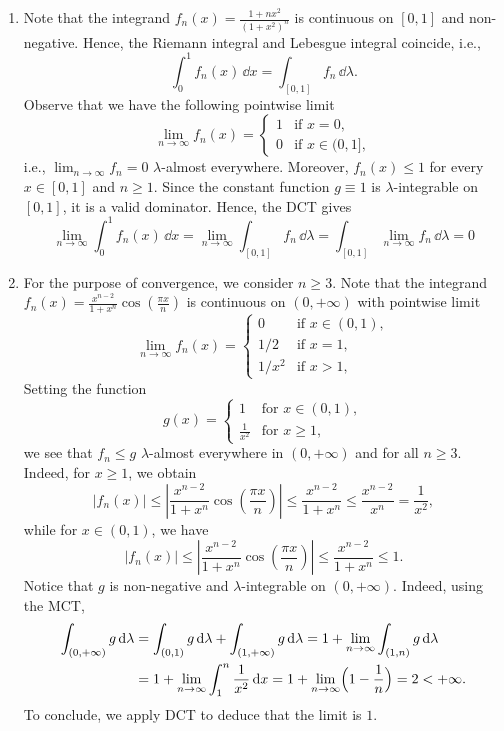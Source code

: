 \begin{enumerate}[label={(\alph*)}]
	\item Note that the integrand $f_n(x)=\frac{1+n x^2}{(1+x^2)^n}$ is continuous on $[0, 1]$ and non-negative. Hence, the Riemann integral and Lebesgue integral coincide, i.e.,
	\[
		\int_0^1 f_n(x)\,\dd x = \int_{[0,1]} f_n\,\dd\lambda.
	\] 
	Observe that we have the following pointwise limit
	\[
		\lim_{n\to\infty} f_n(x) = \begin{cases}
			1 &\text{if  $x=0$}, \\
			0 &\text{if $x\in (0,1]$},
		\end{cases}
	\]
	i.e., $\lim_{n\to\infty} f_n = 0$ $\lambda$-almost everywhere. Moreover, $f_n(x) \le 1$ for every $x\in[0,1]$ and $n\ge 1$. Since the constant function $g\equiv 1$ is $\lambda$-integrable on $[0,1]$, it is a valid dominator. Hence, the DCT gives
	\[
		\lim_{n\to\infty} \int_0^1 f_n(x)\,\dd x = \lim_{n\to\infty} \int_{[0,1]} f_n\,\dd \lambda = \int_{[0,1]} \lim_{n\to\infty} f_n\,\dd\lambda = 0
	\]
	
	\item For the purpose of convergence, we consider $n\ge 3$. Note that the integrand $f_n(x)=\frac{x^{n-2}}{1+x^n}\cos\left(\frac{\pi x}{n}\right)$ is continuous on $(0, +\infty)$ with pointwise limit
	\[
		\lim_{n\to\infty} f_n(x) = \begin{cases}
			0 & \text{if $x\in(0,1)$}, \\
			1/2 & \text{if $x=1$}, \\
			1/x^2 & \text{if $x>1$},
		\end{cases}
	\]
	Setting the function
	\[
		g(x) = \begin{cases}
			1 &\text{for $x\in(0,1)$},\\
			\frac{1}{x^2} &\text{for $x\ge 1$},
		\end{cases}
	\]
	we see that $f_n\le g$ $\lambda$-almost everywhere in $(0,+\infty)$ and for all $n\ge 3$. Indeed, for $x\ge 1$, we obtain
	\[
		|f_n(x)| \le \left| \frac{x^{n-2}}{1+x^n}\cos\left(\frac{\pi x}{n}\right)\right| \le \frac{x^{n-2}}{1+x^n} \le \frac{x^{n-2}}{x^n} =\frac{1}{x^2},
	\]
	while for $x\in(0,1)$, we have
	\[
		|f_n(x)| \le \left| \frac{x^{n-2}}{1+x^n}\cos\left(\frac{\pi x}{n}\right)\right| \le \frac{x^{n-2}}{1+x^n} \le 1.
	\]
	Notice that $g$ is non-negative and $\lambda$-integrable on $(0,+\infty)$. Indeed, using the MCT,
	\begin{align*}
		\int_{(0,+\infty)} g\,\mathrm{d}\lambda &= \int_{(0,1)} g\,\mathrm{d}\lambda + \int_{(1,+\infty)} g\,\mathrm{d}\lambda = 1 + \lim_{n\to\infty} \int_{(1,n)} g\,\mathrm{d}\lambda \\
		&= 1 + \lim_{n\to\infty} \int_1^n \frac{1}{x^2}\,\mathrm{d} x = 1 + \lim_{n\to\infty} \Bigl(1-\frac{1}{n} \Bigr) = 2 < +\infty.
	\end{align*}
	To conclude, we apply DCT to deduce that the limit is $1$.
	
\end{enumerate}

